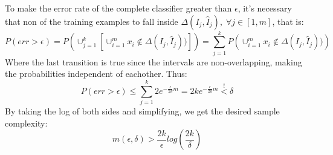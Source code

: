 To make the error rate of the complete classifier greater than $\epsilon$, it's necessary that non of the training examples to fall inside
$\Delta(I_j, \hat{I}_j), \; \forall j\in[1,m]$, that is:
\begin{equation*}
    P(err > \epsilon) = P\left(\cup_{j=1}^{k} \left[ \cup_{i=1}^{m} x_i \notin \Delta(I_j, \hat{I}_j)) \right]\right) = \sum_{j=1}^{k} P\left(\cup_{i=1}^{m} x_i \notin \Delta(I_j, \hat{I}_j))\right)
\end{equation*}
Where the last transition is true since the intervals are non-overlapping, making the probabilities independent of eachother.
Thus:
\begin{equation*}
    P(err > \epsilon) \leq \sum_{j=1}^{k} 2e^{-\frac{\epsilon}{2k}m} = 2ke^{-\frac{\epsilon}{2k}m} \overset{!}{<} \delta
\end{equation*}
By taking the log of both sides and simplifying, we get the desired sample complexity:
\begin{equation*}
    m(\epsilon, \delta) > \frac{2k}{\epsilon} log(\frac{2k}{\delta})
\end{equation*}


